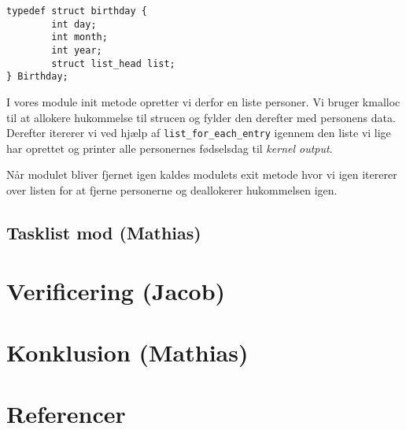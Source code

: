 \documentclass[danish]{report}
\begin{document}
\begin{lstlisting}
typedef struct birthday {
        int day;
        int month;
        int year;
        struct list_head list;
} Birthday;
\end{lstlisting}

I vores module init metode opretter vi derfor en liste personer. Vi bruger kmalloc til at allokere hukommelse til strucen og fylder den derefter med personens data. Derefter itererer vi ved hjælp af \texttt{list\_for\_each\_entry} igennem den liste vi lige har oprettet og printer alle personernes fødselsdag til \textit{kernel output}.

Når modulet bliver fjernet igen kaldes modulets exit metode hvor vi igen itererer over listen for at fjerne personerne og deallokerer hukommelsen igen. 


\section{Tasklist mod (Mathias)}
\chapter{Verificering (Jacob)}
\chapter{Konklusion (Mathias)}
\chapter{Referencer}
\end{document}
